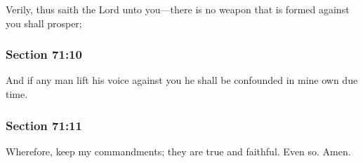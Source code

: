 		Verily, thus saith the Lord unto you---there is no weapon that is formed against you shall prosper;


	\subsubsection{Section 71:10} %
		\label{DC71-10}

		And if any man lift his voice against you he shall be confounded in mine own due time.


	\subsubsection{Section 71:11} %
		\label{DC71-11}

		Wherefore, keep my commandments; they are true and faithful.  Even so.  Amen.

